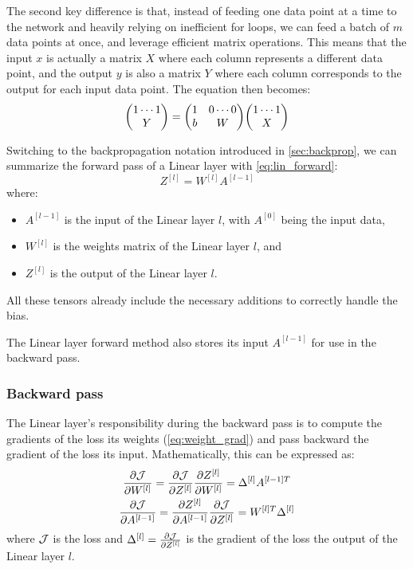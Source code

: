 The second key difference is that, instead of feeding one data point at a time to the network and heavily relying on inefficient for loops, we can feed a batch of $m$ data points at once, and leverage efficient matrix operations. This means that the input $x$ is actually a matrix $X$ where each column represents a different data point, and the output $y$ is also a matrix $Y$ where each column corresponds to the output for each input data point. The equation then becomes:
\begin{equation*}
    \mqty( 1 \cdots 1 \\ Y ) = \mqty( 1 & 0 \cdots 0 \\ b & W ) \mqty( 1 \cdots 1 \\ X )
\end{equation*}

Switching to the backpropagation notation introduced in \cref{sec:backprop}, we can summarize the forward pass of a Linear layer with \cref{eq:lin_forward}:
\begin{equation}
    Z^{[l]} = W^{[l]} A^{[l - 1]}
\end{equation}
where:
\begin{itemize}
    \item $A^{[l - 1]}$ is the  input of the Linear layer $l$, with $A^{[0]}$ being the input data,
    \item $W^{[l]}$ is the  weights matrix of the Linear layer $l$, and
    \item $Z^{[l]}$ is the  output of the Linear layer $l$.
\end{itemize}
All these tensors already include the necessary additions to correctly handle the bias.

The Linear layer forward method also stores its input $A^{[l - 1]}$ for use in the backward pass.

\subsubsection{Backward pass}
The Linear layer's responsibility during the backward pass is to compute the gradients of the loss \wrt its weights (\cref{eq:weight_grad}) and pass backward the gradient of the loss \wrt its input. Mathematically, this can be expressed as:
\begin{gather*}
    \pdv{\mathcal{J}}{W^{[l]}} = \pdv{\mathcal{J}}{Z^{[l]}} \pdv{Z^{[l]}}{W^{[l]}} = \Delta^{[l]} A^{[l - 1]T}\\
    \pdv{\mathcal{J}}{A^{[l - 1]}} = \pdv{Z^{[l]}}{A^{[l - 1]}} \pdv{\mathcal{J}}{Z^{[l]}} = W^{[l]T} \Delta^{[l]}
\end{gather*}
where $\mathcal{J}$ is the loss and $\Delta^{[l]} = \pdv{\mathcal{J}}{Z^{[l]}}$ is the gradient of the loss \wrt the output of the Linear layer $l$.


